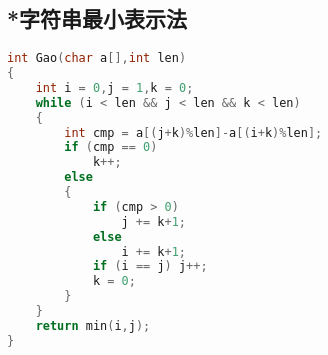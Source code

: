 \subsection{*字符串最小表示法}
	\begin{lstlisting}[language=c++]
int Gao(char a[],int len)
{
	int i = 0,j = 1,k = 0;
	while (i < len && j < len && k < len)
	{
		int cmp = a[(j+k)%len]-a[(i+k)%len];
		if (cmp == 0)
			k++;
		else
		{
			if (cmp > 0)
				j += k+1;
			else
				i += k+1;
			if (i == j)	j++;
			k = 0;
		}
	}
	return min(i,j);
}
	\end{lstlisting}